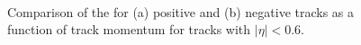 \begin{figure}[h]
\centering
{}
~
\caption{Comparison of the \epcor for (a) positive and (b) negative tracks as a function of track momentum for tracks with $|\eta|<0.6$.}
\label{fig:eoverp_corrected_charge}
\end{figure}

